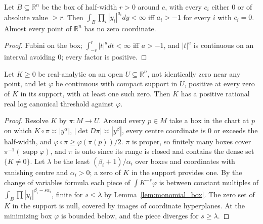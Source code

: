 \begin{lemma}\label{lem:monomial_box}
\leanok
{}
Let $B\subseteq\mathbb R^n$ be the box of half-width $r>0$ around $c$, with every $c_i$ either $0$ or
of absolute value $>r$. Then $\int_B\prod_i|y_i|^{a_i}dy<\infty$ iff $a_i>-1$ for every $i$ with
$c_i=0$. Almost every point of $\mathbb R^n$ has no zero coordinate.
\end{lemma}
\begin{proof}
\leanok
Fubini on the box; $\int_{-r}^{r}|t|^adt<\infty$ iff $a>-1$, and $|t|^a$ is continuous on an
interval avoiding $0$; every factor is positive.
\end{proof}

\begin{theorem}\label{thm:analytic_rlct}
\leanok
{}
Let $K\ge0$ be real-analytic on an open $U\subseteq\mathbb R^n$, not identically zero near any point,
and let $\varphi$ be continuous with compact support in $U$, positive at every zero of $K$ in its
support, with at least one such zero. Then $K$ has a positive rational real log canonical threshold
against $\varphi$.
\end{theorem}
\begin{proof}
\leanok
Resolve $K$ by $\pi:M\to U$. Around every $p\in M$ take a box in the chart at $p$ on which
$K\circ\pi\asymp|y^{\alpha}|$, $|\det D\pi|\asymp|y^{\beta}|$, every centre coordinate is $0$ or
exceeds the half-width, and $\varphi\circ\pi\ge\varphi(\pi(p))/2$. $\pi$ is proper, so finitely many
boxes cover $\pi^{-1}(\operatorname{supp}\varphi)$, and $\pi$ is onto since its range is closed and
contains the dense set $\{K\neq0\}$. Let $\lambda$ be the least $(\beta_i+1)/\alpha_i$ over boxes and
coordinates with vanishing centre and $\alpha_i>0$; a zero of $K$ in the support provides one. By the
change of variables formula each piece of $\int K^{-s}\varphi$ is between constant multiples of
$\int_B\prod|y_i|^{\beta_i-s\alpha_i}$, finite for $s<\lambda$ by Lemma~\ref{lem:monomial_box}. The
zero set of $K$ in the support is null, covered by images of coordinate hyperplanes. At the
minimizing box $\varphi$ is bounded below, and the piece diverges for $s\ge\lambda$.
\end{proof}

